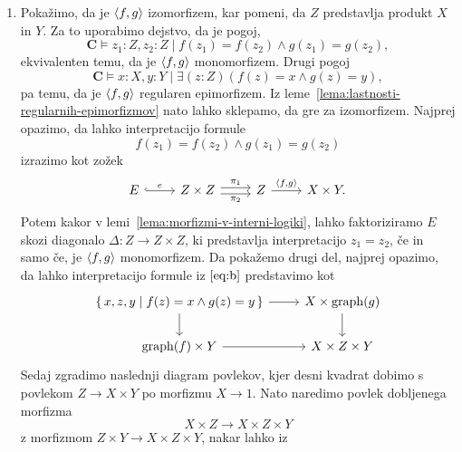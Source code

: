 \documentclass[../kategoricna_logika.tex]{subfiles}
\begin{document}
\begin{dokaz}
\begin{enumerate}[label=(\roman*)]
    \item Pokažimo, da je $\langle f,g \rangle$ izomorfizem, kar pomeni, da
      $Z$ predstavlja produkt $X$ in $Y$. Za to uporabimo dejstvo, da
      je pogoj,
      \begin{equation}
        \label{eq:a}
        \mathbf{C} \models z_1:Z,z_2:Z \mid f(z_{1}) = f(z_{2}) \land g(z_{1}) = g(z_{2}), 
      \end{equation}
      ekvivalenten temu, da je \( \langle f,g \rangle\) monomorfizem.  Drugi
      pogoj
      \begin{equation}
        \label{eq:b}
        \mathbf{C} \models x:X,y:Y \mid  \exists (z:Z)(f(z) = x \land g(z) = y),
      \end{equation}
      pa temu, da je \( \langle f,g \rangle\)
      regularen epimorfizem.  Iz leme~\ref{lema:lastnosti-regularnih-epimorfizmov}
      nato lahko
      sklepamo, da gre za izomorfizem.  Najprej opazimo, da lahko
      interpretacijo formule
      \[ f(z_{1}) = f(z_{2}) \land g(z_{1}) = g(z_{2})\] izrazimo kot
      zožek
      \begin{equation*}
        \begin{tikzcd}
          E \ar[r, hook, "e"] & Z \times Z \ar[r, shift left,
          "\pi_{1}"] \ar[r, shift right, "\pi_{2}"'] & Z \ar[r, ,
          "\fprod{f, g}"] & X \times Y.
        \end{tikzcd}
      \end{equation*}
      Potem kakor v lemi~\ref{lema:morfizmi-v-interni-logiki}, lahko faktoriziramo $E$ skozi
      diagonalo $\Delta : Z \to Z \times Z$, ki predstavlja
      interpretacijo $z_{1} = z_{2}$, če in samo če, je $\langle f, g \rangle$
      monomorfizem.  Da pokažemo drugi del, najprej opazimo, da lahko
      interpretacijo formule iz $\eqref{eq:b}$ predstavimo kot
      \begin{equation}\label{diag:injektivnost-produkta}
        \begin{tikzcd}
          \set{x,z,y \mid f(z) = x \land g(z) = y} \ar[d] \ar[r] &
          X \times \mathrm{graph}(g) \ar[d] \\
          \mathrm{graph}(f) \times Y \ar[r] & X \times Z \times Y
        \end{tikzcd}
      \end{equation}
      Sedaj zgradimo naslednji diagram povlekov, kjer desni kvadrat
      dobimo s povlekom $Z \to X \times Y$ po morfizmu $X \to 1$. Nato
      naredimo povlek dobljenega morfizma
      \[X \times Z \to X \times Z \times Y\] z morfizmom
      $Z \times Y \to X \times Z \times Y$, nakar lahko iz

\end{enumerate}
\end{dokaz}
\end{document}
